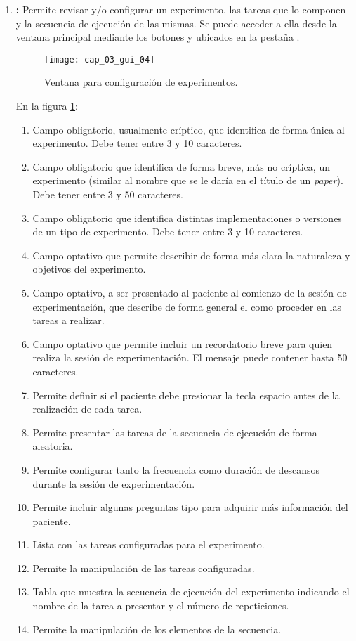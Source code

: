 \documentclass[\main/Main.tex]{subfiles}
\begin{document}
\begin{enumerate}
				\item \textbf{:} Permite revisar y/o configurar un experimento, las tareas que lo componen y la secuencia de ejecución de las mismas. Se puede acceder a ella desde la ventana principal mediante los botones  y  ubicados en la pestaña .
				\begin{figure}[H]
					\centering
					\texttt{[image: cap\_03\_gui\_04]}
					\caption{Ventana para configuración de experimentos.}
					\label{fig:03_gui_exp}
				\end{figure}

				\vspace{-5mm}

				En la figura \ref{fig:03_gui_exp}:
				\begin{enumerate}[(1)]\setlength\itemsep{-0.5em}
					\item Campo obligatorio, usualmente críptico, que identifica de forma única al experimento. Debe tener entre 3 y 10 caracteres.
					\item Campo obligatorio que identifica de forma breve, más no críptica, un experimento (similar al nombre que se le daría en el título de un \textit{paper}). Debe tener entre 3 y 50 caracteres.
					\item Campo obligatorio que identifica distintas implementaciones o versiones de un tipo de experimento. Debe tener entre 3 y 10 caracteres.
					\item Campo optativo que permite describir de forma más clara la naturaleza y objetivos del experimento.
					\item Campo optativo, a ser presentado al paciente al comienzo de la sesión de experimentación, que describe de forma general el como proceder en las tareas a realizar.
					\item Campo optativo que permite incluir un recordatorio breve para quien realiza la sesión de experimentación. El mensaje puede contener hasta 50 caracteres. 
					\item Permite definir si el paciente debe presionar la tecla espacio antes de la realización de cada tarea. 
					\item Permite presentar las tareas de la secuencia de ejecución de forma aleatoria.
					\item Permite configurar tanto la frecuencia como duración de descansos durante la sesión de experimentación.
					\item Permite incluir algunas preguntas tipo para adquirir más información del paciente. 
					\item Lista con las tareas configuradas para el experimento. 
					\item Permite la manipulación de las tareas configuradas.
					\item Tabla que muestra la secuencia de ejecución del experimento indicando el nombre de la tarea a presentar y el número de repeticiones. 
					\item Permite la manipulación de los elementos de la secuencia. 
				\end{enumerate}


\end{enumerate}
\end{document}
